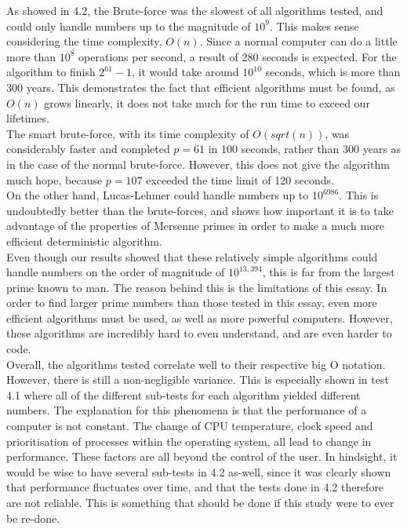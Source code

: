 \documentclass[main.tex]{subfiles}
\begin{document}

As showed in 4.2, the Brute-force was the slowest of all algorithms tested, and
could only handle numbers up to the magnitude of $10^{9}$. This makes sense
considering the time complexity, $O(n)$. Since a normal computer can do a little
more than $10^{8}$ operations per second, a result of 280 seconds is expected.
For the algorithm to finish $2^{61}-1$, it would take around $10^{10}$ seconds,
which is more than 300 years. This demonstrates the fact that efficient
algorithms must be found, as $O(n)$ grows linearly, it does not take much for
the run time to exceed our lifetimes. \\

The smart brute-force, with its time complexity of $O(sqrt(n))$, was
considerably faster and completed $p=61$ in 100 seconds, rather than 300 years
as in the case of the normal brute-force. However, this does not give the
algorithm much hope, because $p=107$ exceeded the time limit of 120 seconds. \\

On the other hand, Lucas-Lehmer could handle numbers up to $10^{6986}$. This is
undoubtedly better than the brute-forces, and shows how important it is to take
advantage of the properties of Mersenne primes in order to make a much more
efficient deterministic algorithm. \\
﻿
Even though our results showed that these relatively simple algorithms could
handle numbers on the order of magnitude of $10^{13,394}$, this is far from the
largest prime known to man. The reason behind this is the limitations of this
essay. In order to find larger prime numbers than those tested in this essay,
even more efficient algorithms must be used, as well as more powerful computers.
However, these algorithms are incredibly hard to even understand, and are even
harder to code. \\

Overall, the algorithms tested correlate well to their respective big O
notation. However, there is still a non-negligible variance. This is especially
shown in test 4.1 where all of the different sub-tests for each algorithm
yielded different numbers. The explanation for this phenomena is that the
performance of a computer is not constant. The change of CPU temperature, clock
speed and prioritisation of processes within the operating system, all lead to
change in performance. These factors are all beyond the control of the user. In
hindsight, it would be wise to have several sub-tests in 4.2 as-well, since it
was clearly shown that performance fluctuates over time, and that the tests done
in 4.2 therefore are not reliable. This is something that should be done if this
study were to ever be re-done. \\
\end{document}
